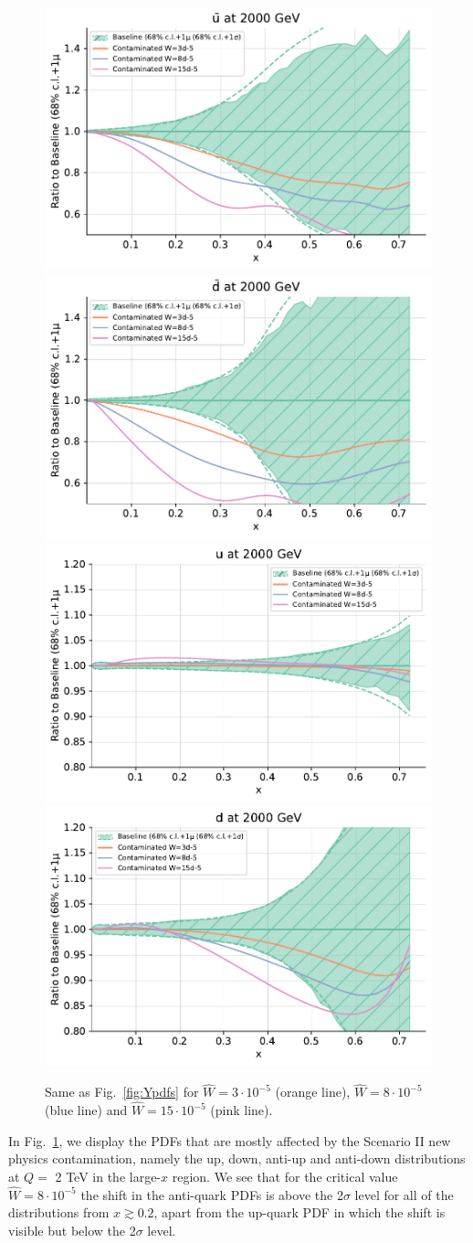 \documentclass[withindex,glossary]{cam-thesis}
\begin{document}
      \begin{figure}[H]
    \includegraphics[width=0.49\linewidth]{Figures/ubar_cont_w_2tev.pdf}
  \includegraphics[width=0.49\linewidth]{Figures/dbar_cont_w_2tev.pdf}\\
  \includegraphics[width=0.49\linewidth]{Figures/u_cont_w_2tev.pdf}
  \includegraphics[width=0.49\linewidth]{Figures/d_cont_w_2tev.pdf}
  \caption{Same as Fig.~\ref{fig:Ypdfs} for $\hat{W}=3\cdot 10^{-5}$ (orange line),
    $\hat{W}=8\cdot 10^{-5}$ (blue line) and $\hat{W}=15\cdot
    10^{-5}$ (pink line).}
  \label{fig:Wpdfs}
      \end{figure}
      In Fig.~\ref{fig:Wpdfs}, we display the PDFs that are mostly affected
by the Scenario II new physics contamination, namely the up, down, anti-up and anti-down
distributions at $Q=$ 2 TeV in the large-$x$ region. We see that for
the critical value $\hat{W} = 8\cdot 10^{-5}$ the shift in the
anti-quark PDFs is above the 2$\sigma$ level for all of the distributions
from $x\gtrsim 0.2$, apart from the up-quark PDF in which the shift is visible but below the 2$\sigma$ level.






\printthesisindex
\end{document}

